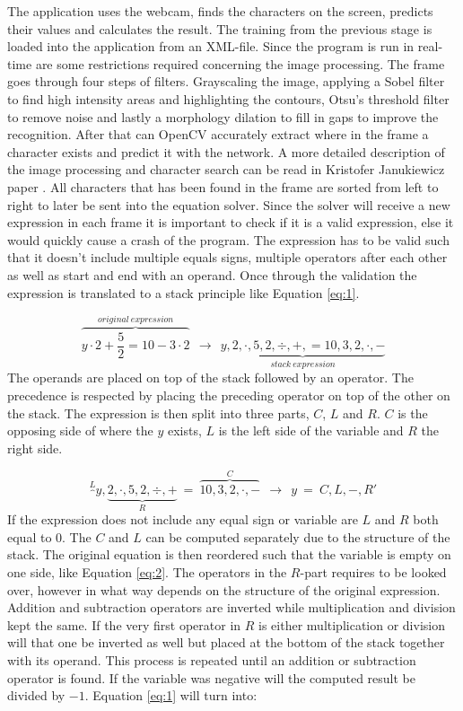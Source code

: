 \documentclass[12pt]{report}
\begin{document}
The application uses the webcam, finds the characters on the screen, predicts their values and calculates the result. The training from the previous stage is loaded into the application from an XML-file. Since the program is run in real-time are some restrictions required concerning the image processing. The frame goes through four steps of filters. Grayscaling the image, applying a Sobel filter to find high intensity areas and highlighting the contours, Otsu's threshold filter to remove noise and lastly a morphology dilation to fill in gaps to improve the recognition. After that can OpenCV accurately extract where in the frame a character exists and predict it with the network. A more detailed description of the image processing and character search can be read in Kristofer Janukiewicz paper \cite{kristofer}.
\newline
\newline
All characters that has been found in the frame are sorted from left to right to later be sent into the equation solver. Since the solver will receive a new expression in each frame it is important to check if it is a valid expression, else it would quickly cause a crash of the program. The expression has to be valid such that it doesn't include multiple equals signs, multiple operators after each other as well as start and end with an operand. Once through the validation the expression is translated to a stack principle like Equation \ref{eq:1}.

\begin{equation}
  \label{eq:1}
  \overbrace{ y \cdot 2+\frac{5}{2}=10-3 \cdot 2}^{original \ expression} \ \ \to \ \ \underbrace{y,2,\cdot,5,2,\div,+,=10,3,2,\cdot,-}_{stack \ expression}
\end{equation}
The operands are placed on top of the stack followed by an operator. The precedence is respected by placing the preceding operator on top of the other on the stack. The expression is then split into three parts, $C$, $L$ and $R$. $C$ is the opposing side of where the $y$ exists, $L$ is the left side of the variable and $R$ the right side.

\begin{equation}
  \label{eq:2}
  \overbrace{}^{L}y, \underbrace{2, \cdot ,5,2,\div,+}_{R} \ = \ \overbrace{10,3,2, \cdot ,-}^{C} \ \ \to \ \ y \ = \ C,L,-,R'
\end{equation}
If the expression does not include any equal sign or variable are $L$ and $R$ both equal to $0$. The $C$ and $L$ can be computed separately due to the structure of the stack. The original equation is then reordered such that the variable is empty on one side, like Equation \ref{eq:2}. The operators in the $R$-part requires to be looked over, however in what way depends on the structure of the original expression. Addition and subtraction operators are inverted while multiplication and division kept the same. If the very first operator in $R$ is either multiplication or division will that one be inverted as well but placed at the bottom of the stack together with its operand. This process is repeated until an addition or subtraction operator is found. If the variable was negative will the computed result be divided by $-1$. Equation \ref{eq:1} will turn into:
\end{document}

